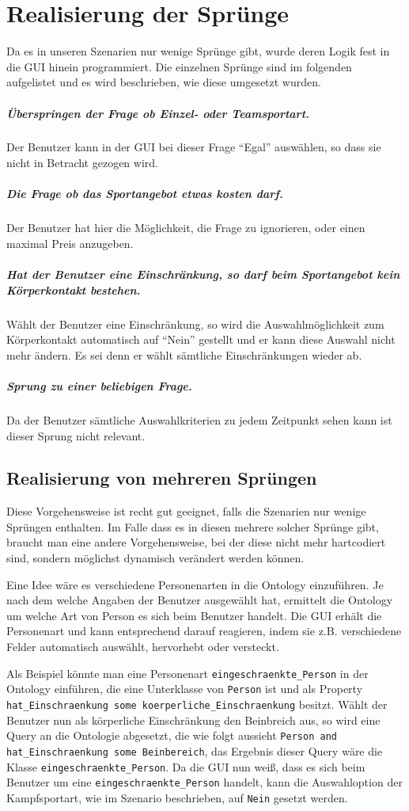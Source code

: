 \section{Realisierung der Sprünge}
Da es in unseren Szenarien nur wenige Sprünge gibt, wurde deren Logik fest in die GUI hinein programmiert. Die einzelnen Sprünge sind im folgenden aufgelistet und es wird beschrieben, wie diese umgesetzt wurden.

\subparagraph{Überspringen der Frage ob Einzel- oder Teamsportart.} Der Benutzer kann in der GUI bei dieser Frage "`Egal"' auswählen, so dass sie nicht in Betracht gezogen wird.
\subparagraph{Die Frage ob das Sportangebot etwas kosten darf.} Der Benutzer hat hier die Möglichkeit, die Frage zu ignorieren, oder einen maximal Preis anzugeben.
\subparagraph{Hat der Benutzer eine Einschränkung, so darf beim Sportangebot kein Körperkontakt bestehen.} Wählt der Benutzer eine Einschränkung, so wird die Auswahlmöglichkeit zum Körperkontakt automatisch auf "`Nein"' gestellt und er kann diese Auswahl nicht mehr ändern. Es sei denn er wählt sämtliche Einschränkungen wieder ab.
\subparagraph{Sprung zu einer beliebigen Frage.} Da der Benutzer sämtliche Auswahlkriterien zu jedem Zeitpunkt sehen kann ist dieser Sprung nicht relevant.

\subsection{Realisierung von mehreren Sprüngen}
Diese Vorgehensweise ist recht gut geeignet, falls die Szenarien nur wenige Sprüngen enthalten. Im Falle dass es in diesen mehrere solcher Sprünge gibt, braucht man eine andere Vorgehensweise, bei der diese nicht mehr hartcodiert sind, sondern möglichst dynamisch verändert werden können.

Eine Idee wäre es verschiedene Personenarten in die Ontology einzuführen. Je nach dem welche Angaben der Benutzer ausgewählt hat, ermittelt die Ontology um welche Art von Person es sich beim Benutzer handelt. Die GUI erhält die Personenart und kann entsprechend darauf reagieren, indem sie z.B. verschiedene Felder automatisch auswählt, hervorhebt oder versteckt.

Als Beispiel könnte man eine Personenart \lstinline"eingeschraenkte_Person" in der Ontology einführen, die eine Unterklasse von \lstinline"Person" ist und als Property \lstinline"hat_Einschraenkung some koerperliche_Einschraenkung" besitzt. Wählt der Benutzer nun als körperliche Einschränkung den Beinbreich aus, so wird eine Query an die Ontologie abgesetzt, die wie folgt aussieht \lstinline"Person and hat_Einschraenkung some Beinbereich", das Ergebnis dieser Query wäre die Klasse \lstinline"eingeschraenkte_Person". Da die GUI nun weiß, dass es sich beim Benutzer um eine \lstinline"eingeschraenkte_Person" handelt, kann die Auswahloption der Kampfsportart, wie im Szenario beschrieben, auf \lstinline"Nein" gesetzt werden.

